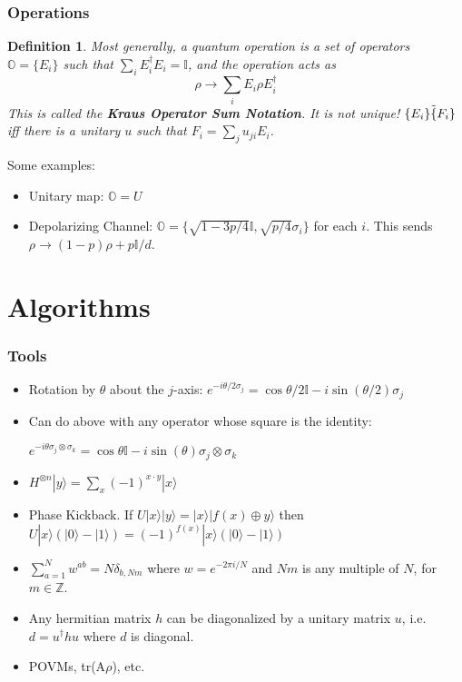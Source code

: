 \documentclass[12pt]{article}
\newtheorem{define}[theorem]{Definition}
\begin{document}
\section{Operations}
\begin{define}
Most generally, a quantum operation is a set of operators $\mathbb{O}=\{E_i\}$ such that $\sum_iE_i^\dagger E_i=\mathbb{I}$, and the operation acts as 
$$\rho\rightarrow \sum_i E_i \rho E_i^\dagger$$
This is called the {\bf{Kraus Operator Sum Notation}}. It is not unique! $\{E_i\}\tilde\{F_i\}$ iff there is a unitary $u$ such that $F_i=\sum_j u_{ji}E_i$. 
\end{define}
Some examples:
\begin{itemize}
\item Unitary map: $\mathbb{O}=U$
\item Depolarizing Channel: $\mathbb{O}=\{\sqrt{1-3p/4}\mathbb{I}, \sqrt{p/4}\sigma_i\}$ for each $i$. This sends $\rho\rightarrow (1-p)\rho+p\mathbb{I}/d$.
\end{itemize}

\part{Algorithms}
\setcounter{section}{0}
\section{Tools}

\begin{itemize}
\item Rotation by $\theta$ about the $j$-axis: $e^{-i\theta/2\sigma_j}=\cos{\theta/2}\mathbb{I}-i\sin(\theta/2)\sigma_j$
\item Can do above with any operator whose square is the identity: 

 $e^{-i\theta\sigma_j\otimes\sigma_k}=\cos{\theta}\mathbb{I}-i\sin(\theta)\sigma_j\otimes\sigma_k$
\item $H^{\otimes n}|y\rangle=\sum_x(-1)^{x\cdot y}|x\rangle$

\item Phase Kickback. If $U|x\rangle|y\rangle=|x\rangle|f(x)\oplus y\rangle$ then $U|x\rangle(|0\rangle-|1\rangle)=(-1)^{f(x)}|x\rangle(|0\rangle-|1\rangle)$

\item $\sum_{a=1}^Nw^{ab}=N\delta_{b,Nm}$ where $w=e^{-2\pi i/N}$ and $Nm$ is any multiple of $N$, for $m\in\mathbb{Z}$.

\item Any hermitian matrix $h$ can be diagonalized by a unitary matrix $u$, i.e. $d=u^\dagger h u$ where $d$ is diagonal.

\item POVMs, tr(A$\rho$), etc.




\end{itemize}
\end{document}
